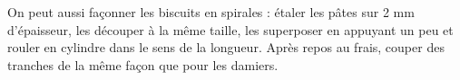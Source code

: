 \begin{conseils}
On peut aussi façonner les biscuits en spirales : étaler les pâtes sur 2 mm d'épaisseur, les découper à la même taille, les superposer en appuyant un peu et rouler en cylindre dans le sens de la longueur. Après repos au frais, couper des tranches de la même façon que pour les damiers.
\end{conseils}
